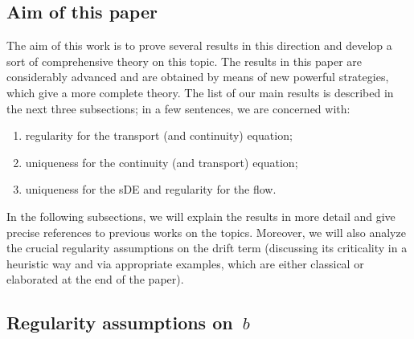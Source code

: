 \documentclass[a4paper,10pt]{article}
\newcommand\1{\mathbbm{1}}
\numberwithin{equation}{section}
\begin{document}
\subsection{Aim of this paper}

The aim of this work is to prove several results in this direction and develop a sort of comprehensive theory on this topic. The results in this paper are considerably advanced and are obtained by means of new powerful strategies, which give a more complete theory. The list of our main results is described in the next three subsections; in a few sentences, we are concerned with:
\begin{enumerate}[font=\normalfont, label=(\roman{*}), ref=(\roman{*})]
\item regularity for the transport (and continuity) equation;
\item uniqueness for the continuity (and transport) equation;
\item uniqueness for the sDE and regularity for the flow.
\end{enumerate}

In the following subsections, we will explain the results in more detail and give precise references to previous works on the topics. Moreover, we will also analyze the crucial regularity assumptions on the drift term (discussing its criticality in a heuristic way and via appropriate examples, which are either classical or elaborated at the end of the paper).

\subsection{Regularity assumptions on~$b$}
\end{document}
